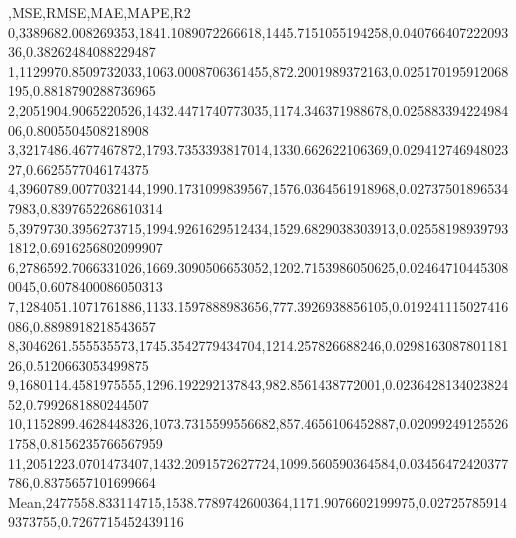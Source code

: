 ,MSE,RMSE,MAE,MAPE,R2
0,3389682.008269353,1841.1089072266618,1445.7151055194258,0.04076640722209336,0.38262484088229487
1,1129970.8509732033,1063.0008706361455,872.2001989372163,0.025170195912068195,0.8818790288736965
2,2051904.9065220526,1432.4471740773035,1174.346371988678,0.02588339422498406,0.8005504508218908
3,3217486.4677467872,1793.7353393817014,1330.662622106369,0.02941274694802327,0.6625577046174375
4,3960789.0077032144,1990.1731099839567,1576.0364561918968,0.027375018965347983,0.8397652268610314
5,3979730.3956273715,1994.9261629512434,1529.6829038303913,0.025581989397931812,0.6916256802099907
6,2786592.7066331026,1669.3090506653052,1202.7153986050625,0.024647104453080045,0.6078400086050313
7,1284051.1071761886,1133.1597888983656,777.3926938856105,0.019241115027416086,0.8898918218543657
8,3046261.555535573,1745.3542779434704,1214.257826688246,0.029816308780118126,0.5120663053499875
9,1680114.4581975555,1296.192292137843,982.8561438772001,0.023642813402382452,0.7992681880244507
10,1152899.4628448326,1073.7315599556682,857.4656106452887,0.020992491255261758,0.8156235766567959
11,2051223.0701473407,1432.2091572627724,1099.560590364584,0.03456472420377786,0.8375657101699664
Mean,2477558.833114715,1538.7789742600364,1171.9076602199975,0.027257859149373755,0.7267715452439116
